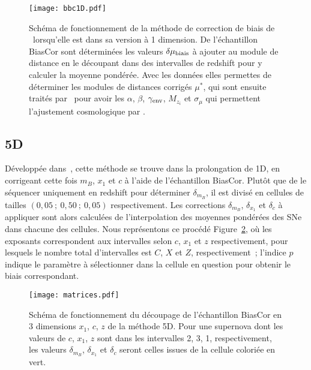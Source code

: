 \documentclass[../main/main.tex]{subfiles}
\begin{document}
\begin{figure}[]
    \centering
    \texttt{[image: bbc1D.pdf]}
    \caption[Schéma de fonctionnement de la méthode de correction de biais de
    \bbc1D]{Schéma de fonctionnement de la méthode de correction de biais de
        \bbc\ lorsqu'elle est dans sa version à 1 dimension. De l'échantillon
        BiasCor sont déterminées les valeurs $\delta\mu_{\rm biais}$ à ajouter
        au module de distance en le découpant dans des intervalles de redshift
        pour y calculer la moyenne pondérée. Avec les données elles permettes de
        déterminer les modules de distances corrigés $\mu^*$, qui sont ensuite
        traités par \saltmu\ pour avoir les $\alpha$, $\beta$, $\gamma_{\rm
        env}$, $M_{z_i}$ et $\sigma_{\mu}$ qui permettent l'ajustement
    cosmologique par \wfit.}
    \label{fig:bbc1d}
\end{figure}

\subsection{\bbc5D}\label{ssec:bbc5D}

Développée dans~\cite{kessler2017}, cette méthode se trouve dans la prolongation
de \bbc1D, en corrigeant cette fois $m_B$, $x_1$ et $c$ à l'aide de
l'échantillon BiasCor. Plutôt que de le séquencer uniquement en redshift pour
déterminer $\delta_{m_B}$, il est divisé en cellules de tailles
$(0,05~;~0,50~;~0,05)$ respectivement. Les corrections $\delta_{m_B}$,
$\delta_{x_1}$ et $\delta_c$ à appliquer sont alors calculées de l'interpolation
des moyennes pondérées des SNe dans chacune des cellules. Nous représentons ce
procédé Figure~\ref{fig:mat}, où les exposants correspondent aux intervalles
selon $c$, $x_1$ et $z$ respectivement, pour lesquels le nombre total
d'intervalles est $C$, $X$ et $Z$, respectivement~; l'indice $p$ indique le
paramètre à sélectionner dans la cellule en question pour obtenir le biais
correspondant.

\begin{figure}[ht]
    \centering
    \texttt{[image: matrices.pdf]}
    \caption[Schéma de fonctionnement du découpage de l'échantillon BiasCor en 3
    dimensions $x_1$, $c$, $z$ de la méthode \bbc5D]{Schéma de
        fonctionnement du découpage de l'échantillon BiasCor en 3 dimensions
        $x_1$, $c$, $z$ de la méthode \bbc5D. Pour une supernova dont les
        valeurs de $c$, $x_1$, $z$ sont dans les intervalles 2, 3, 1,
        respectivement, les valeurs $\delta_{m_B}$, $\delta_{x_1}$ et $\delta_c$
    seront celles issues de la cellule coloriée en vert.}
    \label{fig:mat}
\end{figure}
\end{document}
